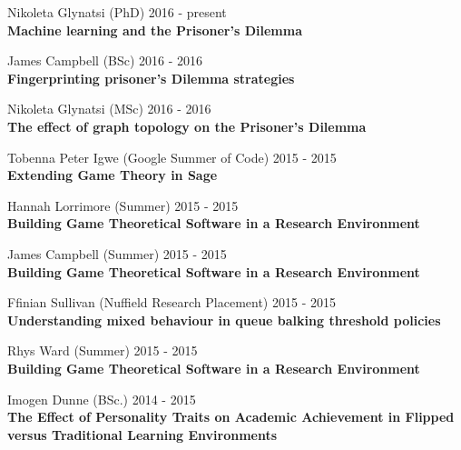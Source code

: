 \documentclass[10pt]{res} %
\begin{document}
\begin{resume}
\begin{etaremune}
\item
    Nikoleta Glynatsi (PhD) \hfill 2016 -
    present\\
\textbf{Machine learning and the Prisoner's Dilemma}\\

\item
    James Campbell (BSc) \hfill 2016 -
    2016\\
\textbf{Fingerprinting prisoner's Dilemma strategies}\\

\item
    Nikoleta Glynatsi (MSc) \hfill 2016 -
    2016\\
\textbf{The effect of graph topology on the Prisoner's Dilemma}\\

\item
    Tobenna Peter Igwe (Google Summer of Code) \hfill 2015 -
    2015\\
\textbf{Extending Game Theory in Sage}\\

\item
    Hannah Lorrimore (Summer) \hfill 2015 -
    2015\\
\textbf{Building Game Theoretical Software in a Research Environment}\\

\item
    James Campbell (Summer) \hfill 2015 -
    2015\\
\textbf{Building Game Theoretical Software in a Research Environment}\\

\item
    Ffinian Sullivan (Nuffield Research Placement) \hfill 2015 -
    2015\\
\textbf{Understanding mixed behaviour in queue balking threshold policies}\\

\item
    Rhys Ward (Summer) \hfill 2015 -
    2015\\
\textbf{Building Game Theoretical Software in a Research Environment}\\

\item
    Imogen Dunne (BSc.) \hfill 2014 -
    2015\\
\textbf{The Effect of Personality Traits on Academic Achievement in Flipped versus Traditional Learning Environments}\\


\end{etaremune}
\end{resume}
\end{document}
